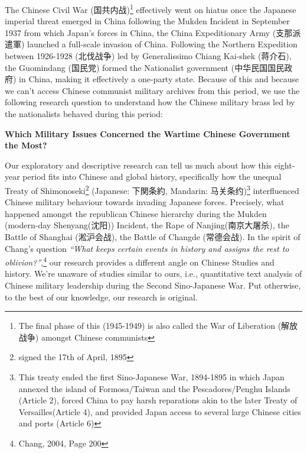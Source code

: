 \documentclass[12pt,letterpaper]{article}
\begin{document}
\begin{CJK*}{UTF8}{gbsn}
		\vspace{.35cm}
		
		\noindent The Chinese Civil War (国共内战)\footnote{The final phase of this (1945-1949) is also called the War of Liberation (解放战争) amongst Chinese communists} effectively went on hiatus once the Japanese imperial threat emerged in China following the Mukden Incident in September 1937 from which Japan’s forces in China, the China Expeditionary Army (支那派遣軍) launched a full-scale invasion of China. Following the Northern Expedition between 1926-1928 (北伐战争) led by Generalissimo Chiang Kai-shek (蒋介石), the Guomindang (国民党) formed the Nationalist government (中华民国国民政府) in China, making it effectively a one-party state. Because of this and because we can’t access Chinese communist military archives from this period, we use the following research question to understand how the Chinese military brass led by the nationalists behaved during this period:
		
		\vspace{.35cm}
		
		{\centering\textbf{ Which Military Issues Concerned the Wartime Chinese Government the Most?}}
		
		\vspace{.35cm}
		
		\noindent Our exploratory and descriptive research can tell us much about how this eight-year period fits into Chinese and global history, specifically how the unequal Treaty of Shimonoseki\footnote{signed the 17th of April, 1895} (Japanese: 下関条約, Mandarin: 马关条约)\footnote{This treaty ended the first Sino-Japanese War, 1894-1895 in which Japan annexed the island of Formosa/Taiwan and the Pescadores/Penghu Islands (Article 2), forced China to pay harsh reparations akin to the later Treaty of Versailles(Article 4), and provided Japan access to several large Chinese cities and ports (Article 6)} interfluenced Chinese military behaviour towards invading Japanese forces. Precisely, what happened amongst the republican Chinese hierarchy during the Mukden (modern-day Shenyang(沈阳)) Incident, the Rape of Nanjing(南京大屠杀), the Battle of Shanghai (淞沪会战), the Battle of Changde (常德会战). In the spirit of Chang’s question \textit{“What keeps certain events in history and assigns the rest to oblivion?”},\footnote{Chang, 2004, Page 200} our research provides a different angle on Chinese Studies and history.
		We’re unaware of studies similar to ours, i.e., quantitative text analysis of Chinese military leadership during the Second Sino-Japanese War. Put otherwise, to the best of our knowledge, our research is original. 
		

\end{CJK*}
\end{document}
